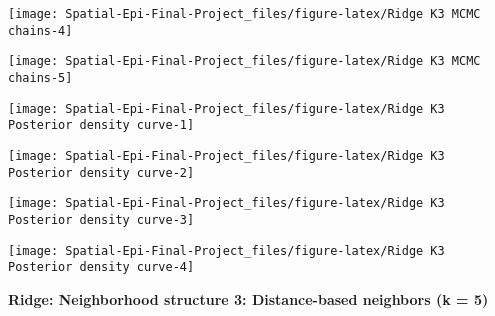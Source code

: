 \documentclass[]{article}
\begin{document}
\begin{center}\texttt{[image: Spatial-Epi-Final-Project\_files/figure-latex/Ridge K3 MCMC chains-4]} \end{center}

\begin{center}\texttt{[image: Spatial-Epi-Final-Project\_files/figure-latex/Ridge K3 MCMC chains-5]} \end{center}

\begin{center}\texttt{[image: Spatial-Epi-Final-Project\_files/figure-latex/Ridge K3 Posterior density curve-1]} \end{center}

\begin{center}\texttt{[image: Spatial-Epi-Final-Project\_files/figure-latex/Ridge K3 Posterior density curve-2]} \end{center}

\begin{center}\texttt{[image: Spatial-Epi-Final-Project\_files/figure-latex/Ridge K3 Posterior density curve-3]} \end{center}

\begin{center}\texttt{[image: Spatial-Epi-Final-Project\_files/figure-latex/Ridge K3 Posterior density curve-4]} \end{center}

\textbf{Ridge: Neighborhood structure 3: Distance-based neighbors (k =
5)}
\end{document}
